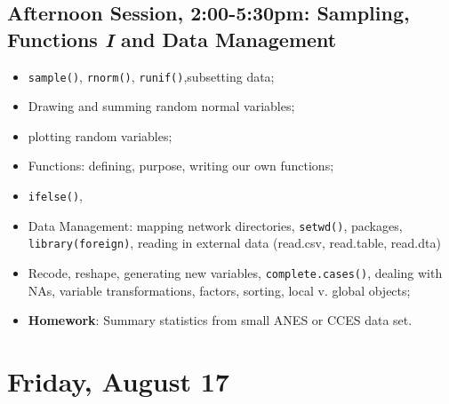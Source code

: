 \documentclass[12pt,a4paper]{article}
\begin{document}
\subsection*{Afternoon Session, 2:00-5:30pm: Sampling, Functions \emph{I} and Data Management}
\begin{itemize}
\setlength{\itemsep}{0pt}
\footnotesize
\item \texttt{sample()}, \texttt{rnorm()}, \texttt{runif()},subsetting data;
\item Drawing and summing random normal variables;
\item plotting random variables;
\item Functions: defining, purpose, writing our own functions;
\item \texttt{ifelse()},
\item Data Management: mapping network directories, \texttt{setwd()}, packages, \texttt{library(foreign)}, reading in external data (read.csv, read.table, read.dta)
\item Recode, reshape, generating new variables, \texttt{complete.cases()}, dealing with NAs, variable transformations, factors, sorting, local v. global objects;
\item \textbf{Homework}: Summary statistics from small ANES or CCES data set.
\end{itemize}



\section*{Friday, August 17}
\end{document}

